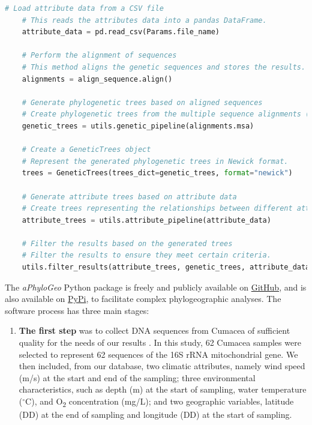 {\begin{lstlisting}[label=lst:main,language=Python,caption=Main script for tutorial using the aPhyloGeo package.]
    # Load attribute data from a CSV file
    # This reads the attributes data into a pandas DataFrame.
    attribute_data = pd.read_csv(Params.file_name)

    # Perform the alignment of sequences
    # This method aligns the genetic sequences and stores the results.
    alignments = align_sequence.align()

    # Generate phylogenetic trees based on aligned sequences
    # Create phylogenetic trees from the multiple sequence alignments (MSA).
    genetic_trees = utils.genetic_pipeline(alignments.msa)
    
    # Create a GeneticTrees object
    # Represent the generated phylogenetic trees in Newick format.
    trees = GeneticTrees(trees_dict=genetic_trees, format="newick")
   
    # Generate attribute trees based on attribute data
    # Create trees representing the relationships between different attributes.
    attribute_trees = utils.attribute_pipeline(attribute_data)
    
    # Filter the results based on the generated trees
    # Filter the results to ensure they meet certain criteria.
    utils.filter_results(attribute_trees, genetic_trees, attribute_data)
\end{lstlisting}

The \textit{aPhyloGeo} Python package is freely and publicly available on \href{https://github.com/tahiri-lab/aPhyloGeo}{GitHub}, and is also available on \href{https://pypi.org/project/aphylogeo/}{PyPi}, to facilitate complex phylogeographic analyses. The software process has three main stages:

\begin{enumerate}
\item \textbf{The first step} was to collect DNA sequences from Cumacea of sufficient quality for the needs of our results \citep{koshkarov_phylogeography_2022}. In this study, 62 Cumacea samples were selected to represent 62 sequences of the 16S rRNA mitochondrial gene. We then included, from our database, two climatic attributes, namely wind speed (m/s) at the start and end of the sampling; three environmental characteristics, such as depth (m) at the start of sampling, water temperature ($^\circ$C), and O\textsubscript{2} concentration (mg/L); and two geographic variables, latitude (DD) at the end of sampling and longitude (DD) at the start of sampling.


\end{enumerate}}
